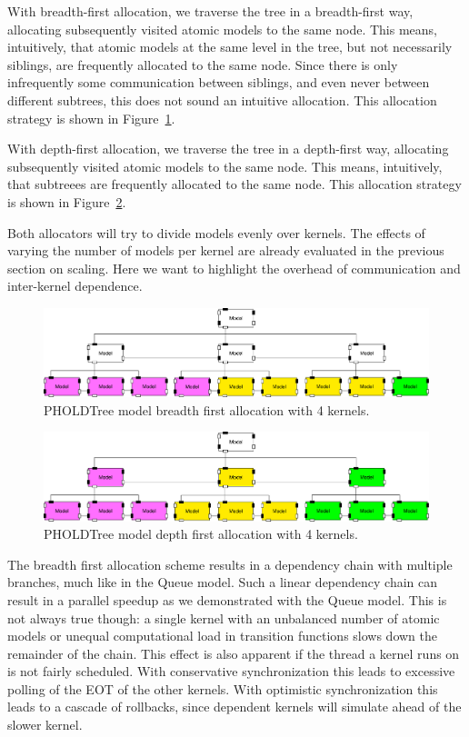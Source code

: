With breadth-first allocation, we traverse the tree in a breadth-first way, allocating subsequently visited atomic models to the same node.
This means, intuitively, that atomic models at the same level in the tree, but not necessarily siblings, are frequently allocated to the same node.
Since there is only infrequently some communication between siblings, and even never between different subtrees, this does not sound an intuitive allocation.
This allocation strategy is shown in Figure~\ref{fig:PholdTree_model_bfs}.

With depth-first allocation, we traverse the tree in a depth-first way, allocating subsequently visited atomic models to the same node.
This means, intuitively, that subtreees are frequently allocated to the same node.
This allocation strategy is shown in Figure~\ref{fig:PholdTree_model_dfs}.

Both allocators will try to divide models evenly over kernels. The effects of varying the number of models per kernel are already evaluated in the previous section on scaling. Here we want to highlight the overhead of communication and inter-kernel dependence. 

\begin{figure}
   \center
   \includegraphics[width=\columnwidth]{fig/pholdtree_alloc_BF.pdf}
   \caption{PHOLDTree model breadth first allocation with 4 kernels.}
   \label{fig:PholdTree_model_bfs}
\end{figure}
\begin{figure}
   \center
   \includegraphics[width=\columnwidth]{fig/pholdtree_alloc_DF.pdf}
   \caption{PHOLDTree model depth first allocation with 4 kernels.}
   \label{fig:PholdTree_model_dfs}
\end{figure}

The breadth first allocation scheme results in a dependency chain with multiple branches, much like in the Queue model.
Such a linear dependency chain can result in a parallel speedup as we demonstrated with the Queue model.
This is not always true though: a single kernel with an unbalanced number of atomic models or unequal computational load in transition functions slows down the remainder of the chain.
This effect is also apparent if the thread a kernel runs on is not fairly scheduled.
With conservative synchronization this leads to excessive polling of the EOT of the other kernels.
With optimistic synchronization this leads to a cascade of rollbacks, since dependent kernels will simulate ahead of the slower kernel.

